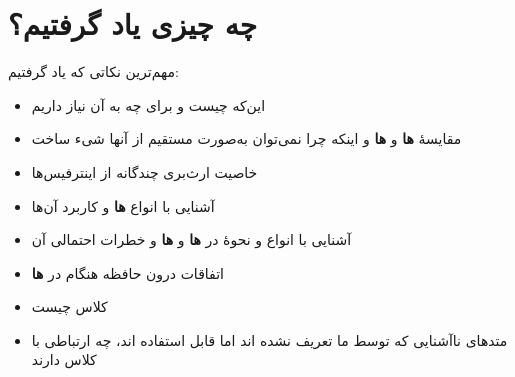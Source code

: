 \section{چه چیزی یاد گرفتیم؟}

مهم‌ترین نکاتی که یاد گرفتیم:

\begin{itemize}
\tightlist
\item
  این‌که \textbf{} چیست و برای چه به آن نیاز داریم
\item
  مقایسۀ \textbf{ ها} و \textbf{ ها} و
  اینکه چرا نمی‌توان به‌صورت مستقیم از آنها شیء ساخت
\item
  خاصیت ارث‌بری چندگانه از اینترفیس‌ها
\item
  آشنایی با انواع \textbf{ ها} و کاربرد آن‌ها
\item
  آشنایی با انواع و نحوۀ \textbf{} در
  \textbf{ ها} و \textbf{ ها} و
  خطرات احتمالی آن
\item
  اتفاقات درون حافظه هنگام \textbf{} در
  \textbf{ ها}
\item
  کلاس \textbf{} چیست
\item
  متدهای ناآشنایی که توسط ما تعریف نشده اند اما قابل استفاده اند، چه
  ارتباطی با کلاس \textbf{} دارند
\end{itemize}
	
	
	
	
